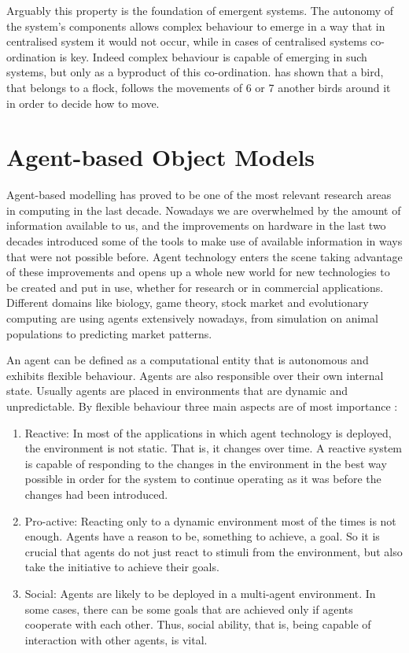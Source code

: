 Arguably this property is the foundation of emergent systems. The autonomy of the system's components allows complex behaviour to emerge in a way that in centralised system it would not occur, while in cases of centralised systems co-ordination is key. Indeed complex behaviour is capable of emerging in such systems, but only as a byproduct of this co-ordination. \citeauthor{ballerini2008interaction} has shown that a bird, that belongs to a flock, follows the movements of 6 or 7 another birds around it in order to decide how to move.

\section{Agent-based Object Models}

Agent-based modelling has proved to be one of the most relevant research areas in computing in the last decade. Nowadays we are overwhelmed by the amount of information available to us, and the improvements on hardware in the last two decades introduced some of the tools to make use of available information in ways that were not possible before. Agent technology enters the scene taking advantage of these improvements and opens up a whole new world for new technologies to be created and put in use, whether for research or in  commercial applications. Different domains like biology, game theory, stock market and evolutionary computing are using agents extensively nowadays, from simulation on animal populations \cite{Caplat2008491} to predicting market patterns. \cite{andreoni1995}

An agent can be defined as a computational entity that is autonomous and exhibits flexible behaviour. Agents are also responsible over their own internal state. Usually agents are placed in environments that are dynamic and unpredictable. By flexible behaviour three main aspects are of most importance \cite{wooldridge2009introduction} :

\begin{enumerate}
\item Reactive: In most of the applications in which agent technology is deployed, the environment is not static. That is, it changes over time. A reactive system is capable of responding to the changes in the environment in the best way possible in order for the system to continue operating as it was before the changes had been introduced. 

\item Pro-active: Reacting only to a dynamic environment most of the times is not enough. Agents have a reason to be, something to achieve, a goal. So it is crucial that agents do not just react to stimuli from the environment, but also take the initiative to achieve their goals.

\item Social: Agents are likely to be deployed in a multi-agent environment. In some cases, there can be some goals that are achieved only if agents cooperate with each other. Thus, social ability, that is, being capable of interaction with other agents, is vital.
\end{enumerate}

